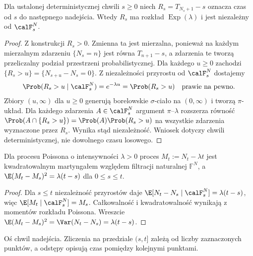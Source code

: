 \begin{wniosek}
Dla ustalonej deterministycznej chwili $s\ge0$ niech
$R_s=T_{N_s+1}-s$ oznacza czas od $s$ do następnego
nadejścia. Wtedy $R_s$ ma rozkład $\operatorname{Exp}(\lambda)$
i jest niezależny od $\calF_s^N$.
\end{wniosek}
\begin{proof}
Z konstrukcji $R_s>0$. Zmienna ta jest mierzalna,
ponieważ na każdym mierzalnym zdarzeniu $\{N_s=n\}$
jest równa $T_{n+1}-s$, a zdarzenia te tworzą przeliczalny
podział przestrzeni probabilistycznej. Dla każdego $u\ge0$ zachodzi
$\{R_s>u\}=\{N_{s+u}-N_s=0\}$.
Z niezależności przyrostu od $\calF_s^N$ dostajemy
\[
\Prob(R_s>u\mid\calF_s^N)=e^{-\lambda u}
=\Prob(R_s>u)
\quad\text{prawie na pewno}.
\]
Zbiory $(u,\infty)$ dla $u\ge0$ generują borelowskie
$\sigma$-ciało na $(0,\infty)$ i tworzą $\pi$-układ.
Dla każdego zdarzenia $A\in\calF_s^N$ argument
$\pi$--$\lambda$ rozszerza równość
$\Prob(A\cap\{R_s>u\})=\Prob(A)\Prob(R_s>u)$
na wszystkie zdarzenia wyznaczone przez $R_s$.
Wynika stąd niezależność. Wniosek dotyczy chwili
deterministycznej, nie dowolnego czasu losowego.
\end{proof}

\begin{wniosek}
Dla procesu Poissona o intensywności $\lambda>0$ proces
$M_t:=N_t-\lambda t$ jest kwadratowalnym martyngałem względem
filtracji naturalnej $\mathbb F^N$, a
$\E(M_t-M_s)^2=\lambda(t-s)$ dla $0\le s\le t$.
\end{wniosek}
\begin{proof}
Dla $s\le t$ niezależność przyrostów daje
$\E[N_t-N_s\mid\calF_s^N]=\lambda(t-s)$,
więc $\E[M_t\mid\calF_s^N]=M_s$.
Całkowalność i kwadratowalność wynikają z momentów
rozkładu Poissona. Wreszcie
$\E(M_t-M_s)^2=\Var(N_t-N_s)=\lambda(t-s)$.
\end{proof}


\begin{center}
\par\smallskip\small Oś chwil nadejścia. Zliczenia na przedziale $(s,t]$
 zależą od liczby zaznaczonych punktów, a odstępy opisują
 czas pomiędzy kolejnymi punktami.
\end{center}

